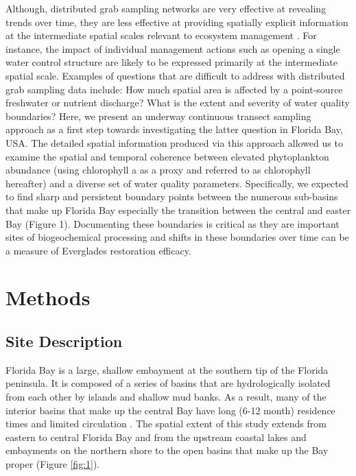 Although, distributed grab sampling networks are very effective at revealing trends over time, they are less effective at providing spatially explicit information at the intermediate spatial scales relevant to ecosystem management \citep{anttila2008feasible}. For instance, the impact of individual management actions such as opening a single water control structure are likely to be expressed primarily at the intermediate spatial scale. Examples of questions that are difficult to address with distributed grab sampling data include: How much spatial area is affected by a point-source freshwater or nutrient discharge? What is the extent and severity of water quality boundaries? Here, we present an underway continuous transect sampling approach as a first step towards investigating the latter question in Florida Bay, USA. The detailed spatial information produced via this approach allowed us to examine the spatial and temporal coherence between elevated phytoplankton abundance (using chlorophyll a as a proxy and referred to as chlorophyll hereafter) and a diverse set of water quality parameters. Specifically, we expected to find sharp and persistent boundary points between the numerous sub-basins that make up Florida Bay especially the transition between the central and easter Bay (Figure 1). Documenting these boundaries is critical as they are important sites of biogeochemical processing and shifts in these boundaries over time can be a measure of Everglades restoration efficacy.
\section{Methods}
\label{methods}
\subsection{Site Description}
\label{sitedescription}
Florida Bay is a large, shallow embayment at the southern tip of the Florida peninsula. It is composed of a series of basins that are hydrologically isolated from each other by islands and shallow mud banks. As a result, many of the interior basins that make up the central Bay have long (6-12 month) residence times and limited circulation \citep{lee2016circulation}. The spatial extent of this study extends from eastern to central Florida Bay and from the upstream coastal lakes and embayments on the northern shore to the open basins that make up the Bay proper (Figure \ref{fig:1}). 

